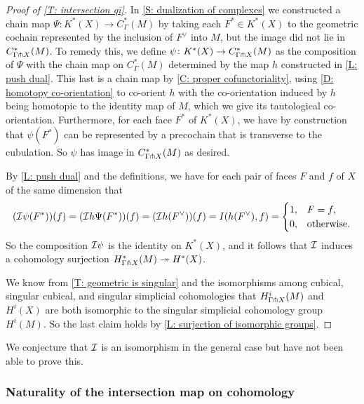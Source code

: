 \begin{proof}[Proof of \cref{T: intersection qi}]
	In \cref{S: dualization of complexes} we constructed a chain map $\Psi \colon K^*(X) \to C_\Gamma^*(M)$ by taking each $F^* \in K^*(X)$ to the geometric cochain represented by the inclusion of $F^\vee$ into $M$, but the image did not lie in $C^*_{\Gamma \pitchfork X}(M)$.
	To remedy this, we define $\psi \colon K^*(X) \to C_{\Gamma \pitchfork X}^*(M)$ as the composition of $\Psi$ with the chain map on $C^*_{\Gamma}(M)$ determined by the map $h$ constructed in \cref{L: push dual}.
	This last is a chain map by \cref{C: proper cofunctoriality}, using \cref{D: homotopy co-orientation} to co-orient $h$ with the co-orientation induced by $h$ being homotopic to the identity map of $M$, which we give its tautological co-orientation.
	Furthermore, for each face $F^*$ of $K^*(X)$, we have by construction that $\psi(F^*)$ can be represented by a precochain that is transverse to the cubulation.
	So $\psi$ has image in $C_{\Gamma \pitchfork X}^*(M)$ as desired.

	By \cref{L: push dual} and the definitions, we have for each pair of faces $F$ and $f$ of $X$ of the same dimension that
	\begin{equation*}
		(\mathcal{I} \psi(F^*))(f) = (\mathcal{I} h \Psi(F^*))(f)\\
		= (\mathcal{I} h (F^\vee))(f)\\
		= I( h (F^\vee) , f) \\
		=
		\begin{cases}
			1, & F=f,\\
			0, & \text{otherwise.}
		\end{cases}
	\end{equation*}
	So the composition $\mathcal{I} \psi$ is the identity on $K^*(X)$, and it follows that $\mathcal{I}$ induces a cohomology surjection $H^*_{\Gamma \pitchfork X}(M)\twoheadrightarrow H^*(X)$.

	We know from \cref{T: geometric is singular} and the isomorphisms among cubical, singular cubical, and singular simplicial cohomologies that $H^i_{\Gamma \pitchfork X}(M)$ and $H^i(X)$ are both isomorphic to the singular simplicial cohomology group $H^i(M)$.
	So the last claim holds by \cref{L: surjection of isomorphic groups}.
\end{proof}

We conjecture that $\mathcal{I}$ is an isomorphism in the general case but have not been able to prove this.

\subsubsection{Naturality of the intersection map on cohomology}


